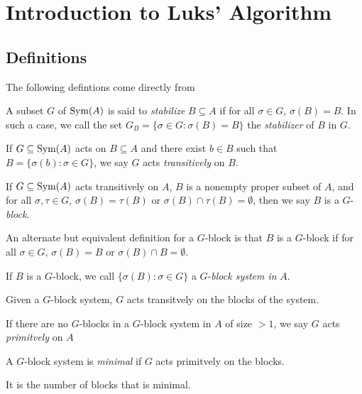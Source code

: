 \section{Introduction to Luks' Algorithm}
\subsection{Definitions}
The following defintions come directly from \cite{luks1982}
\begin{definition}
    A subset $G$ of $\text{Sym}(A)$ is said to \textit{stabilize} $B\subseteq A$ if for all $\sigma\in G$, $\sigma(B)=B$. In such a case, we call the set $G_B=\{\sigma\in G:\sigma(B)=B\}$ the \textit{stabilizer} of $B$ in $G$. 
\end{definition}
\begin{definition}
    If $G\subseteq\text{Sym}(A)$ acts on $B\subseteq A$ and there exist $b\in B$ such that $B=\{\sigma(b):\sigma\in G\}$, we say $G$ acts \textit{transitively} on $B$.
\end{definition}
\begin{definition}
    If $G\subseteq\text{Sym}(A)$ acts transitively on $A$, $B$ is a nonempty proper subset of $A$, and for all $\sigma,\tau\in G$, $\sigma(B)=\tau(B)$ or $\sigma(B)\cap\tau(B)=\emptyset$, then we say $B$ is a $G$-\textit{block}.
\end{definition}
\begin{remark}
    An alternate but equivalent definition for a $G$-block is that $B$ is a $G$-block if for all $\sigma\in G$, $\sigma(B)=B$ or $\sigma(B)\cap B=\emptyset$.
\end{remark}
\begin{definition}
    If $B$ is a $G$-block, we call $\{\sigma(B):\sigma\in G\}$ a $G$-\textit{block system in} $A$.
\end{definition}
\begin{remark}
    Given a $G$-block system, $G$ acts transitvely on the blocks of the system.
\end{remark}
\begin{definition}
    If there are no $G$-blocks in a $G$-block system in $A$ of size $>1$, we say $G$ acts \textit{primitvely} on $A$
\end{definition}
\begin{definition}
    A $G$-block system is \textit{minimal} if $G$ acts primitvely on the blocks.
\end{definition}
\begin{remark}
    It is the number of blocks that is minimal.
\end{remark}
